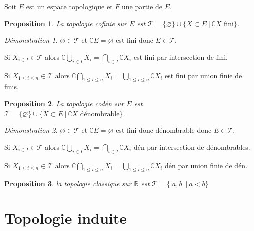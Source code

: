 \documentclass[a4paper, 11pt, french]{book}
\newenvironment{itemise}{\itemize}{\enditemize}
\theoremstyle{plain} %
\newtheorem{proposition}{Proposition}
\theoremstyle{definition} %
\theoremstyle{remark} %
\newtheorem*{demonstration}{Démonstration}
\newcommand{\1}{\mathds{1}}
\newcommand\vide{\varnothing}
\newcommand{\infegal}{\leqslant}
\newcommand{\R}{\mathbb{R}}
\newcommand\ens[2]{\{#1 \ |\ #2\}}
\begin{document}
Soit $E$ est un espace topologique et $F$ une partie de $E$.

\begin{proposition}
	La topologie cofinie sur $E$ est $\mathscr{T}=\{\vide\}\cup\ens{X\subset E}{\complement X\text{ fini}}$.
\end{proposition}

\begin{demonstration}
	\begin{itemise}
		\item $\vide\in\mathscr{T}$ et $\complement E=\vide$ est fini donc $E\in\mathscr{T}$.
		\item Si $X_{i\in I}\in\mathscr{T}$ alors $\complement\bigcup_{i\in I}X_i=\bigcap_{i\in I}\complement X_i$ est fini par intersection de fini.
		\item Si $X_{1\infegal i\infegal n}\in\mathscr{T}$ alors $\complement\bigcap_{1\infegal i\infegal n}X_i=\bigcup_{1\infegal i\infegal n}\complement X_i$ est fini par union finie de finis.
	\end{itemise}
\end{demonstration}

\begin{proposition}
	La topologie codén sur $E$ est $\mathscr{T}=\{\vide\}\cup\ens{X\subset E}{\complement X\text{ dénombrable}}$.
\end{proposition}

\begin{demonstration}
	\begin{itemise}
		\item $\vide\in\mathscr{T}$ et $\complement E=\vide$ est fini donc dénombrable donc $E\in\mathscr{T}$.
		\item Si $X_{i\in I}\in\mathscr{T}$ alors $\complement\bigcup_{i\in I}X_i=\bigcap_{i\in I}\complement X_i$ dén par intersection de dénombrables.
		\item Si $X_{1\infegal i\infegal n}\in\mathscr{T}$ alors $\complement\bigcap_{1\infegal i\infegal n}X_i=\bigcup_{1\infegal i\infegal n}\complement X_i$ dén par union finie de dén.
	\end{itemise}
\end{demonstration}

\begin{proposition}
	la topologie classique sur $\R$ est $\mathscr{T}=\ens{]a, b[}{a<b}$
\end{proposition}

\section{Topologie induite}
\end{document}
